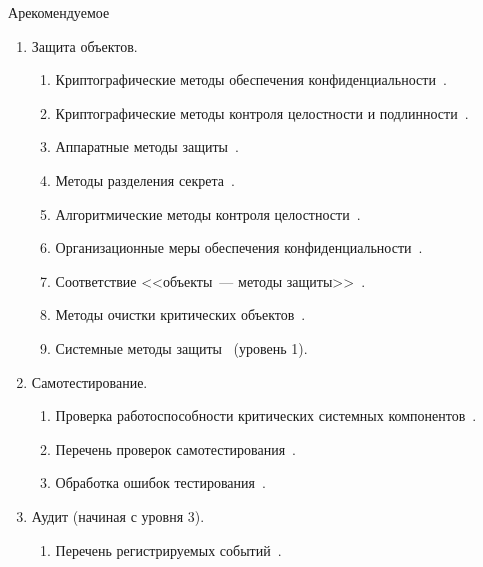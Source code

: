 \begin{appendix}{А}{рекомендуемое}
\begin{enumerate}
\begin{enumerate}
\item
Состояния СКЗИ и правила перехода между состояниями~.
\end{enumerate}

\item
{Защита объектов.}

\begin{enumerate}
\item
Криптографические методы обеспечения конфиденциальности~.

\item
Криптографические методы контроля целостности и 
подлинности~. 

\item
Аппаратные методы защиты~.

\item
Методы разделения секрета~.

\item
Алгоритмические методы контроля целостности~.

\item
Организационные меры обеспечения конфиденциальности~.

\item
Соответствие <<объекты~--- методы защиты>>~.

\item
Методы очистки критических объектов~.

\item
Системные методы защиты~ (уровень 1).
\end{enumerate}

\item
{Самотестирование.}

\begin{enumerate}
\item
Проверка работоспособности критических системных компонентов~.

\item
Перечень проверок самотестирования~.

\item
Обработка ошибок тестирования~.
\end{enumerate}

\item
Аудит (начиная с уровня 3).

\begin{enumerate}
\item
Перечень регистрируемых событий~.


\end{enumerate}
\end{enumerate}
\end{appendix}
